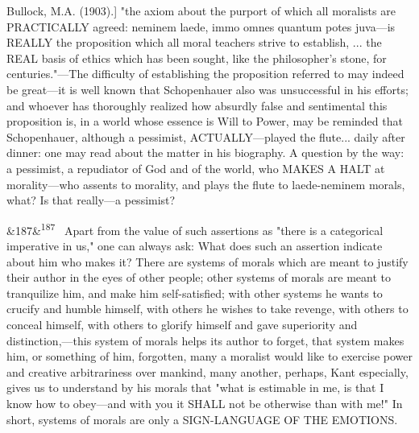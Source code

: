 \documentclass[12pt]{article}
\newcommand{\para}[1][]{\par\noindent\ifx&#1&\else\textsuperscript{\footnotesize #1}~\fi}
\begin{document}
Bullock, M.A. (1903).] "the axiom about the purport of which all moralists are PRACTICALLY agreed: neminem laede, immo omnes quantum potes juva---is REALLY the proposition which all moral teachers strive to establish, ... the REAL basis of ethics which has been sought, like the philosopher's stone, for centuries."---The difficulty of establishing the proposition referred to may indeed be great---it is well known that Schopenhauer also was unsuccessful in his efforts; and whoever has thoroughly realized how absurdly false and sentimental this proposition is, in a world whose essence is Will to Power, may be reminded that Schopenhauer, although a pessimist, ACTUALLY---played the flute... daily after dinner: one may read about the matter in his biography. A question by the way: a pessimist, a repudiator of God and of the world, who MAKES A HALT at morality---who assents to morality, and plays the flute to laede-neminem morals, what? Is that really---a pessimist?

\para[187] Apart from the value of such assertions as "there is a categorical imperative in us," one can always ask: What does such an assertion indicate about him who makes it? There are systems of morals which are meant to justify their author in the eyes of other people; other systems of morals are meant to tranquilize him, and make him self-satisfied; with other systems he wants to crucify and humble himself, with others he wishes to take revenge, with others to conceal himself, with others to glorify himself and gave superiority and distinction,---this system of morals helps its author to forget, that system makes him, or something of him, forgotten, many a moralist would like to exercise power and creative arbitrariness over mankind, many another, perhaps, Kant especially, gives us to understand by his morals that "what is estimable in me, is that I know how to obey---and with you it SHALL not be otherwise than with me!" In short, systems of morals are only a SIGN-LANGUAGE OF THE EMOTIONS.
\end{document}
